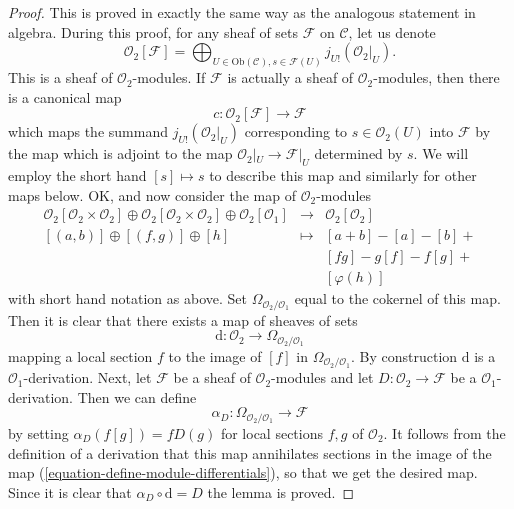 \begin{proof}
This is proved in exactly the same way as the analogous statement in algebra.
During this proof, for any sheaf of sets $\mathcal{F}$ on $\mathcal{C}$,
let us denote
$$
\mathcal{O}_2[\mathcal{F}]
=
\bigoplus\nolimits_{U \in \text{Ob}(\mathcal{C}), s \in \mathcal{F}(U)}
j_{U!}(\mathcal{O}_2|_U).
$$
This is a sheaf of $\mathcal{O}_2$-modules.
If $\mathcal{F}$ is actually a sheaf of $\mathcal{O}_2$-modules, then there
is a canonical map
$$
c : \mathcal{O}_2[\mathcal{F}] \longrightarrow \mathcal{F}
$$
which maps the summand $j_{U!}(\mathcal{O}_2|_U)$ corresponding to
$s \in \mathcal{O}_2(U)$ into $\mathcal{F}$ by the map which is
adjoint to the map $\mathcal{O}_2|_U \to \mathcal{F}|_U$ determined by $s$.
We will employ the short hand $[s] \mapsto s$ to
describe this map and similarly for other maps below. OK, and now consider
the map of $\mathcal{O}_2$-modules
\begin{equation}
\label{equation-define-module-differentials}
\begin{matrix}
\mathcal{O}_2[\mathcal{O}_2 \times \mathcal{O}_2] \oplus
\mathcal{O}_2[\mathcal{O}_2 \times \mathcal{O}_2] \oplus
\mathcal{O}_2[\mathcal{O}_1] &
\longrightarrow &
\mathcal{O}_2[\mathcal{O}_2] \\
[(a, b)] \oplus [(f, g)] \oplus [h] & \longmapsto & [a + b] - [a] - [b] + \\
& & [fg] - g[f] - f[g] + \\
& & [\varphi(h)]
\end{matrix}
\end{equation}
with short hand notation as above. Set $\Omega_{\mathcal{O}_2/\mathcal{O}_1}$
equal to the cokernel of this map. Then it is clear that there exists
a map of sheaves of sets
$$
\text{d} : \mathcal{O}_2 \longrightarrow \Omega_{\mathcal{O}_2/\mathcal{O}_1}
$$
mapping a local section $f$ to the image of $[f]$ in
$\Omega_{\mathcal{O}_2/\mathcal{O}_1}$. By construction $\text{d}$
is a $\mathcal{O}_1$-derivation. Next, let $\mathcal{F}$
be a sheaf of $\mathcal{O}_2$-modules and let
$D : \mathcal{O}_2 \to \mathcal{F}$ be a $\mathcal{O}_1$-derivation.
Then we can define
$$
\alpha_D : \Omega_{\mathcal{O}_2/\mathcal{O}_1} \longrightarrow \mathcal{F}
$$
by setting $\alpha_D(f[g]) = fD(g)$ for local sections
$f, g$ of $\mathcal{O}_2$. It follows from the definition of a
derivation that this map annihilates sections in the image of the map
(\ref{equation-define-module-differentials}), so that we get the
desired map. Since it is clear that $\alpha_D \circ \text{d} = D$
the lemma is proved.
\end{proof}

